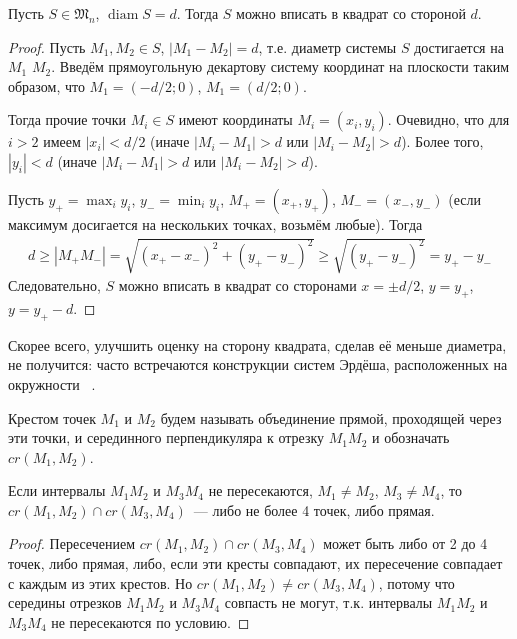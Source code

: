 \begin{lemma}
	\label{lemma:square_container}
	Пусть $S\in\mathfrak{M}_n$, $\operatorname{diam} S = d$.
	Тогда $S$ можно вписать в квадрат со стороной $d$.
\end{lemma}

\begin{proof}
	Пусть $M_1, M_2 \in S$, $|M_1 - M_2| = d$,
	т.е. диаметр системы $S$ достигается на $M_1$  $M_2$.
	Введём прямоугольную декартову систему координат на плоскости таким образом, что
	$M_1 = (-d/2; 0)$, $M_1 = (d/2; 0)$.

	Тогда прочие точки $M_i \in S$ имеют координаты $M_i=(x_i, y_i)$.
	Очевидно, что для $i>2$ имеем $|x_i| < d/2$
	(иначе $|M_i - M_1| > d$ или $|M_i - M_2| > d$).
	Более того, $|y_i| < d$ (иначе $|M_i - M_1| > d$ или $|M_i - M_2| > d$).

	Пусть $y_+ = \max_{i} y_i$, $y_- = \min_{i} y_i$, $M_+=(x_+, y_+)$, $M_-=(x_-, y_-)$
	(если максимум досигается на нескольких точках, возьмём любые).
	Тогда
	\begin{multline}
		d \geq |M_+ M_-| = \sqrt{(x_+ - x_-)^2 + (y_+ - y_-)^2}
		\geq \sqrt{(y_+ - y_-)^2} = y_+ - y_-
	\end{multline}
	Следовательно, $S$ можно вписать в квадрат со сторонами $x=\pm d/2$,
	$y=y_+$, $y=y_+ - d$.
\end{proof}

\begin{remark}
	Скорее всего, улучшить оценку на сторону квадрата, сделав её меньше диаметра,
	не получится: часто встречаются конструкции систем Эрдёша, расположенных на окружности
	~\cite{anning1915discussions,harborth1993upper,piepmeyer1996maximum,kurz2008bounds,our-vvmsh-2018}.
\end{remark}

\begin{definition}
	Крестом точек $M_1$ и $M_2$ будем называть объединение прямой,
	проходящей через эти точки,
	и серединного перпендикуляра к отрезку $M_1 M_2$
	и обозначать $cr(M_1,M_2)$.
\end{definition}

\begin{proposition}
	\label{proposition:intervals_cross}
	Если интервалы $M_1 M_2$ и $M_3 M_4$ не пересекаются,
	$M_1 \neq M_2$, $M_3 \neq M_4$,
	то $cr(M_1,M_2) \cap cr(M_3,M_4)$~--- либо не более 4 точек, либо прямая.
\end{proposition}

\begin{proof}
	Пересечением $cr(M_1,M_2) \cap cr(M_3,M_4)$ может быть либо от 2 до 4 точек, либо прямая,
	либо, если эти кресты совпадают, их пересечение совпадает с каждым из этих крестов.
	Но $cr(M_1,M_2) \neq cr(M_3,M_4)$, потому что середины отрезков $M_1 M_2$ и $M_3 M_4$
	совпасть не могут, т.к. интервалы $M_1 M_2$ и $M_3 M_4$ не пересекаются по условию.
\end{proof}

